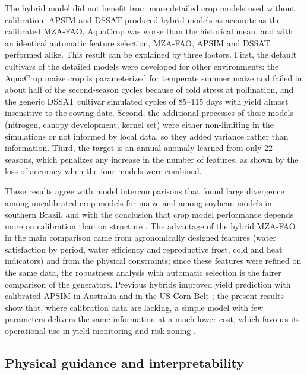 \documentclass[10pt,a4paper]{article}
\begin{document}
The hybrid model did not benefit from more detailed crop models used without calibration. APSIM and DSSAT
produced hybrid models as accurate as the calibrated MZA-FAO, AquaCrop was worse than the historical mean,
and with an identical automatic feature selection, MZA-FAO, APSIM and DSSAT performed alike. This result
can be explained by three factors. First, the default cultivars of the detailed models were developed for
other environments: the AquaCrop maize crop is parameterized for temperate summer maize and failed in about
half of the second-season cycles because of cold stress at pollination, and the generic DSSAT cultivar
simulated cycles of 85--115 days with yield almost insensitive to the sowing date. Second, the
additional processes of these models (nitrogen, canopy development, kernel set) were either non-limiting
in the simulations or not informed by local data, so they added variance rather than information. Third,
the target is an annual anomaly learned from only 22 seasons, which penalizes any increase in the number of
features, as shown by the loss of accuracy when the four models were combined.

These results agree with model intercomparisons that found large divergence among uncalibrated crop models
for maize and among soybean models in southern Brazil, and with the conclusion that crop model performance
depends more on calibration than on structure \citep{bassu2014, battisti2017, seidel2018}. The advantage of
the hybrid MZA-FAO in the main comparison came from agronomically designed features (water satisfaction
by period, water efficiency and reproductive frost, cold and heat indicators) and from the physical
constraints; since these features were refined on the same data, the robustness analysis with automatic
selection is the fairer comparison of the generators. Previous hybrids improved yield prediction with
calibrated APSIM in Australia and in the US Corn Belt \citep{feng2019, shahhosseini2021}; the present
results show that, where calibration data are lacking, a simple model with few parameters delivers the
same information at a much lower cost, which favours its operational use in yield monitoring and risk
zoning \citep{battisti2015, noia2024}.

\subsection{Physical guidance and interpretability}
\label{subsec:dis_physics}
\end{document}

